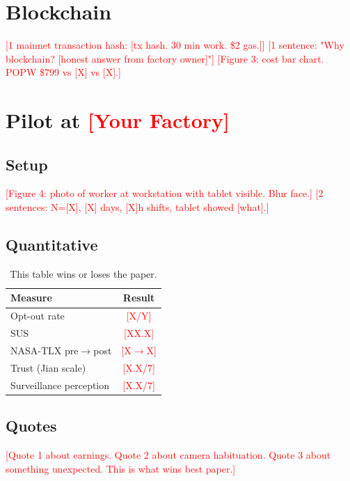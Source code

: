 \documentclass[10pt,twocolumn]{article}
\newcommand{\need}[1]{\textcolor{red}{[#1]}}
\begin{document}
\section{Blockchain}

\need{1 mainnet transaction hash: \need{tx hash. 30 min work. \$2 gas.}}
\need{1 sentence: "Why blockchain? \need{honest answer from factory owner}"}
\need{Figure 3: cost bar chart. POPW \$799 vs \need{X} vs \need{X}.}

\section{Pilot at \need{Your Factory}}

\subsection{Setup}

\need{Figure 4: photo of worker at workstation with tablet visible. Blur face.}
\need{2 sentences: N=\need{X}, \need{X} days, \need{X}h shifts, tablet showed \need{what}.}

\subsection{Quantitative}

\begin{table}[htbp]\centering\small
\caption{This table wins or loses the paper.}
\begin{tabular}{lc}\toprule
\textbf{Measure} & \textbf{Result}\\\midrule
Opt-out rate & \need{X/Y}\\
SUS & \need{XX.X}\\
NASA-TLX pre$\to$post & \need{X$\to$X}\\
Trust (Jian scale) & \need{X.X/7}\\
Surveillance perception & \need{X.X/7}\\\bottomrule
\end{tabular}\end{table}

\subsection{Quotes}

\need{Quote 1 about earnings. Quote 2 about camera habituation. Quote 3 about something unexpected. This is what wins best paper.}
\end{document}
